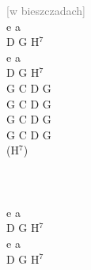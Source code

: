 \documentclass[a5paper, 10pt]{book}
\begin{document}
\begin{minipage}[t]{0.17\textwidth}
\textcolor{gray}{\footnotesize [w bieszczadach]}\\
e a\\
D G H$^7$\\
e a\\
D G H$^7$\\

G C D G\\
G C D G\\
G C D G\\
G C D G\\(H$^7$)\\

~\\~\\~\\

e a\\
D G H$^7$\\
e a\\
D G H$^7$\\
\end{minipage}

\newpage
\end{document}
